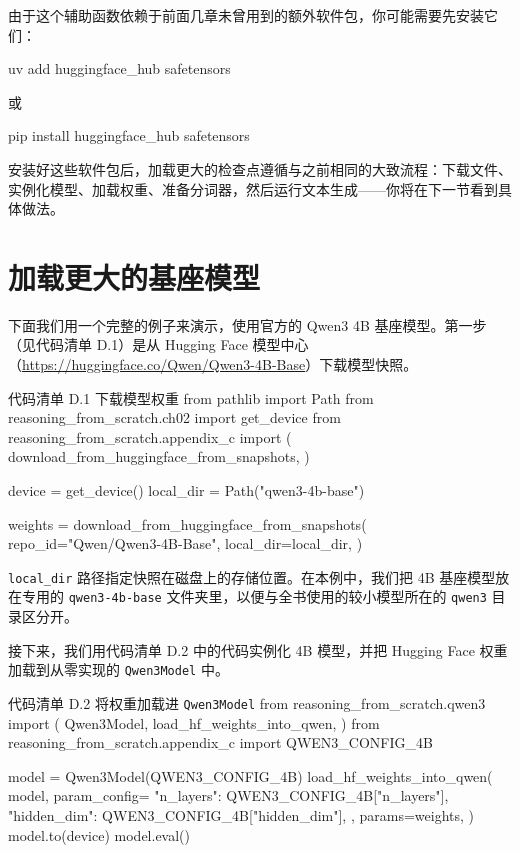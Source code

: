 由于这个辅助函数依赖于前面几章未曾用到的额外软件包，你可能需要先安装它们：

\begin{codebox}
uv add huggingface_hub safetensors
\end{codebox}

或

\begin{codebox}
pip install huggingface_hub safetensors
\end{codebox}

安装好这些软件包后，加载更大的检查点遵循与之前相同的大致流程：下载文件、实例化模型、加载权重、准备分词器，然后运行文本生成——你将在下一节看到具体做法。

\section{加载更大的基座模型}

下面我们用一个完整的例子来演示，使用官方的 Qwen3 4B 基座模型。第一步（见代码清单 D.1）是从 Hugging Face 模型中心（\href{https://huggingface.co/Qwen/Qwen3-4B-Base}{https://huggingface.co/Qwen/Qwen3-4B-Base}）下载模型快照。

\begin{codeboxt}{代码清单 D.1 下载模型权重}
from pathlib import Path
from reasoning_from_scratch.ch02 import get_device
from reasoning_from_scratch.appendix_c import (
    download_from_huggingface_from_snapshots,
)

device = get_device()
local_dir = Path("qwen3-4b-base")

weights = download_from_huggingface_from_snapshots(
    repo_id="Qwen/Qwen3-4B-Base",
    local_dir=local_dir,
)
\end{codeboxt}

\texttt{local\_dir} 路径指定快照在磁盘上的存储位置。在本例中，我们把 4B 基座模型放在专用的 \texttt{qwen3-4b-base} 文件夹里，以便与全书使用的较小模型所在的 \texttt{qwen3} 目录区分开。

接下来，我们用代码清单 D.2 中的代码实例化 4B 模型，并把 Hugging Face 权重加载到从零实现的 \texttt{Qwen3Model} 中。

\begin{codeboxt}{代码清单 D.2 将权重加载进 \texttt{Qwen3Model}}
from reasoning_from_scratch.qwen3 import (
    Qwen3Model,
    load_hf_weights_into_qwen,
)
from reasoning_from_scratch.appendix_c import QWEN3_CONFIG_4B

model = Qwen3Model(QWEN3_CONFIG_4B)
load_hf_weights_into_qwen(
    model,
    param_config={
        "n_layers": QWEN3_CONFIG_4B["n_layers"],
        "hidden_dim": QWEN3_CONFIG_4B["hidden_dim"],
    },
    params=weights,
)
model.to(device)
model.eval()
\end{codeboxt}

